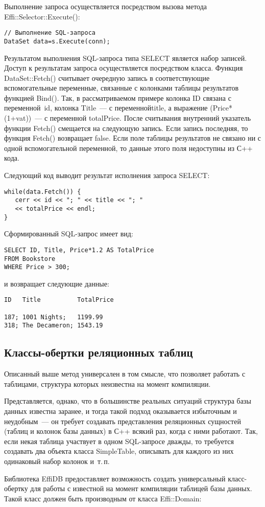\begin{multicols}{2}
Выполнение запроса осуществляется посредством вызова метода {\sf Effi::Selector::Execute()}: 
\begin{verbatim}
// Выполнение SQL-запроса
DataSet data=s.Execute(conn);
\end{verbatim}
Результатом выполнения SQL-за\-про\-са типа SELECT является набор записей. Доступ к 
результатам запроса осуществляется посредством класса. Функция 
{\sf DataSet::Fetch()} считывает очередную запись в соответствующие вспомогательные 
переменные, связанные с колонками табли\-цы результатов функцией {\sf Bind()}. Так, в 
рассмат\-ри\-ваемом примере колонка {\sf ID} связана с переменной~id, колонка {\sf Title}~--- с 
переменной\linebreak title, а выражение ({\sf Price*(1+vat)})~--- с переменной totalPrice. После 
считывания внутренний указатель функции {\sf Fetch()} смещается на следующую запись. Если 
запись последняя, то функция {\sf Fetch()} возвращает false. Если поле таблицы результатов не 
связано ни с одной вспомогательной переменной, то данные этого поля недоступны из 
С++ кода.

Следующий код выводит результат исполнения запроса SELECT: 
\begin{verbatim}
while(data.Fetch()) {
   cerr << id << "; " << title << "; " 
   << totalPrice << endl;
}
\end{verbatim}

Сформированный SQL-запрос имеет вид:
\begin{verbatim}
SELECT ID, Title, Price*1.2 AS TotalPrice
FROM Bookstore
WHERE Price > 300;
\end{verbatim}
и возвращает следующие данные: 
\begin{verbatim}
ID   Title          TotalPrice

187; 1001 Nights;   1199.99
318; The Decameron; 1543.19
\end{verbatim}

\subsection{Классы-обертки реляционных таблиц} %

Описанный выше метод универсален в том смысле, что позволяет работать с таблицами, 
структура которых неизвестна на момент компиляции.

Представляется, однако, что в большинстве реальных ситуаций структура базы данных 
известна заранее, и тогда такой подход оказывается избыточным и неудобным~--- он 
требует создавать пред\-став\-ле\-ния реляционных сущностей (таблиц и колонок базы 
данных) в С++ всякий раз, когда с ними работают. Так, если некая таблица участвует в 
одном SQL-за\-про\-се дважды, то требуется создавать два объекта класса {\sf SimpleTable}, 
описывать для каждого из них одинаковый набор колонок и~т.\,п. 

Библиотека EffiDB предоставляет возможность создать универсальный класс-оберт\-ку для работы с 
известной на момент компиляции таблицей базы данных. Такой класс должен быть 
производным от класса {\sf Effi::Domain}: 
\end{multicols}

